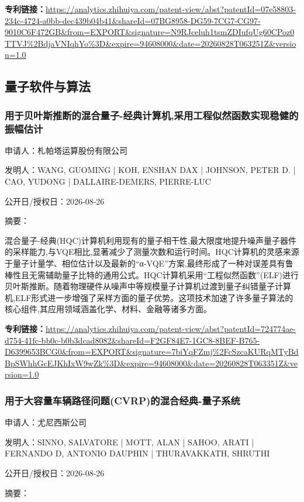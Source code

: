 \documentclass[12pt,a4paper]{ctexart}
\begin{document}
\noindent\textbf{专利链接：}\url{https://analytics.zhihuiya.com/patent-view/abst?patentId=07e58803-234c-4724-a0bb-dec439b04b41&shareId=07BG8958-DG59-7CG7-CG97-9010C6F472GB&from=EXPORT&signature=N9RJceluh1tsmZDIufqUg60CPoz0TTVJ%2BdjaVNIqhYo%3D&expire=94608000&date=20260828T063251Z&version=1.0}


\subsection{ 量子软件与算法 }

\subsubsection{ 用于贝叶斯推断的混合量子-经典计算机,采用工程似然函数实现稳健的振幅估计 }

申请人：札帕塔运算股份有限公司

发明人：WANG, GUOMING | KOH, ENSHAN DAX | JOHNSON, PETER D. | CAO, YUDONG | DALLAIRE-DEMERS, PIERRE-LUC

公开日/授权日：2026-08-26

摘要：

混合量子-经典(HQC)计算机利用现有的量子相干性,最大限度地提升噪声量子器件的采样能力,与VQE相比,显著减少了测量次数和运行时间。HQC计算机的灵感来源于量子计量学、相位估计以及最新的“α-VQE”方案,最终形成了一种对误差具有鲁棒性且无需辅助量子比特的通用公式。HQC计算机采用“工程似然函数”(ELF)进行贝叶斯推断。随着物理硬件从噪声中等规模量子计算机过渡到量子纠错量子计算机,ELF形式进一步增强了采样方面的量子优势。这项技术加速了许多量子算法的核心组件,其应用领域涵盖化学、材料、金融等诸多方面。

\noindent\textbf{专利链接：}\url{https://analytics.zhihuiya.com/patent-view/abst?patentId=724774ae-d754-41fc-bb0c-b0b3dcad8082&shareId=F2GF84E7-1GC8-8BEF-B765-D6399653BCG0&from=EXPORT&signature=7biYqFZmj%2FcSzcaKURqMTyBdBpSWhhGcEJKhIxW9wZk%3D&expire=94608000&date=20260828T063351Z&version=1.0}

\subsubsection{ 用于大容量车辆路径问题(CVRP)的混合经典-量子系统 }

申请人：尤尼西斯公司

发明人：SINNO, SALVATORE | MOTT, ALAN | SAHOO, ARATI | FERNANDO D, ANTONIO DAUPHIN | THURAVAKKATH, SHRUTHI

公开日/授权日：2026-08-26

摘要：
\end{document}
